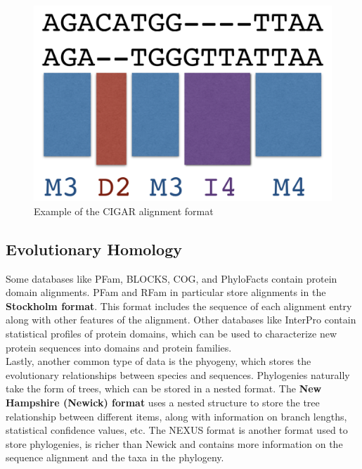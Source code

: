 \documentclass[12pt]{article}
\begin{document}
\begin{figure}[h]
    \centering
    \includegraphics[height = .25\textheight]{cigar.png}
    \caption{Example of the CIGAR alignment format}
    \label{fig:cigar}
\end{figure}
\subsection{Evolutionary Homology}
Some databases like PFam, BLOCKS, COG, and PhyloFacts contain protein domain alignments. PFam and RFam in particular store alignments in the {\bf Stockholm format}. This format includes the sequence of each alignment entry along with other features of the alignment. Other databases like InterPro contain statistical profiles of protein domains, which can be used to characterize new protein sequences into domains and protein families.\\[10pt]
Lastly, another common type of data is the phyogeny, which stores the evolutionary relationships between species and sequences. Phylogenies naturally take the form of trees, which can be stored in a nested format. The {\bf New Hampshire (Newick) format} uses a nested structure to store the tree relationship between different items, along with information on branch lengths, statistical confidence values, etc. The NEXUS format is another format used to store phylogenies, is richer than Newick and contains more information on the sequence alignment and the taxa in the phylogeny.
\end{document}
